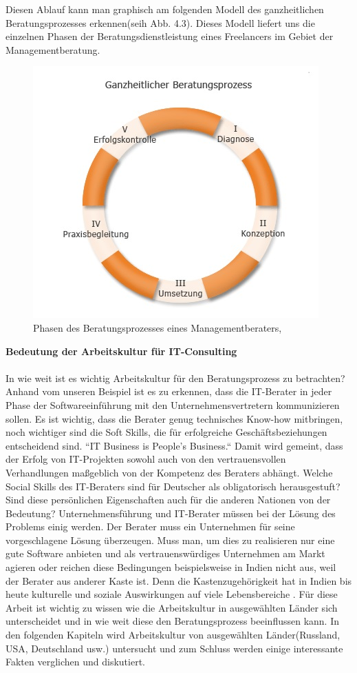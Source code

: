 	Diesen Ablauf kann man graphisch am folgenden Modell des ganzheitlichen Beratungsprozesses erkennen(seih Abb. 4.3). Dieses Modell liefert uns die einzelnen Phasen der Beratungsdienstleistung eines Freelancers im Gebiet der Managementberatung. 
\begin{figure}[htp]
\centering
\includegraphics[width=0.7\linewidth]{./images/beratungsproz}
\caption{Phasen des Beratungsprozesses  eines Managementberaters, \cite{PhasenBeratungsprozess} }
\label{fig:beratungsproz}
\end{figure}
	
	\textbf{ Bedeutung der Arbeitskultur für IT-Consulting}\\ \\
	In wie weit ist es wichtig Arbeitskultur für den Beratungsprozess zu betrachten? Anhand vom unseren Beispiel ist es zu erkennen, dass die IT-Berater in jeder Phase der Softwareeinführung mit den Unternehmensvertretern kommunizieren sollen. Es ist wichtig, dass die Berater genug technisches Know-how mitbringen, noch wichtiger sind die Soft Skills, die für erfolgreiche Geschäftsbeziehungen entscheidend sind. ``IT Business is People's Business.`` Damit wird gemeint, dass der Erfolg von   IT-Projekten sowohl auch von den vertrauensvollen Verhandlungen maßgeblich von der Kompetenz des Beraters abhängt. \cite{ITConsRu}
	Welche Social Skills des IT-Beraters sind für Deutscher als obligatorisch herausgestuft? Sind diese persönlichen Eigenschaften auch für die anderen Nationen von der Bedeutung? Unternehmensführung und IT-Berater müssen bei der Lösung des Problems einig werden. Der Berater muss ein Unternehmen für seine vorgeschlagene Lösung überzeugen. Muss man, um dies zu realisieren nur eine gute Software anbieten und als vertrauenswürdiges Unternehmen am Markt agieren oder reichen diese Bedingungen beispielsweise in Indien nicht aus, weil der Berater aus anderer Kaste ist. Denn die Kastenzugehörigkeit hat in Indien bis heute kulturelle und soziale Auswirkungen auf viele Lebensbereiche \cite{KastensystemInd}.
	Für diese Arbeit ist wichtig zu wissen wie die Arbeitskultur in ausgewählten Länder sich unterscheidet und in wie weit diese den Beratungsprozess beeinflussen kann.
	In den folgenden Kapiteln wird Arbeitskultur von ausgewählten Länder(Russland, USA, Deutschland usw.) untersucht und zum Schluss werden einige interessante Fakten verglichen und diskutiert. 
